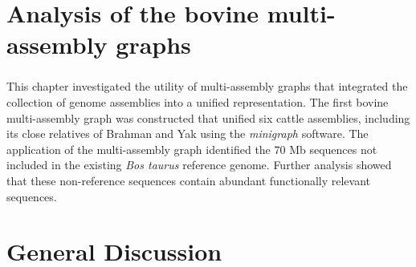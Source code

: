 \documentclass[11 pt, a4paper, notitlepage, twoside]{report}
\begin{document}



\iftwoside
\cleardoublepage
\newpage
\fi

\chapter[Bovine multi-assembly graphs]{\LARGE{Analysis of the bovine multi-assembly graphs}}
\label{chap:multigraph}

\subsection*{}
\normalsize
This chapter investigated the utility of multi-assembly graphs that integrated the collection of genome assemblies into a unified representation. The first bovine multi-assembly graph was constructed that unified six cattle assemblies, including its close relatives of Brahman and Yak using the \emph{minigraph} software. The application of the multi-assembly graph identified the 70 Mb sequences not included in the existing \emph{Bos taurus} reference genome. Further analysis showed that these non-reference sequences contain abundant functionally relevant sequences. \\

\bigskip

\begin{center}\end{center}

\onehalfspacing


\iftwoside
\cleardoublepage
\newpage
\fi


\chapter[General Discussion]{\LARGE{General Discussion}}
\label{chap:discuss}


\end{document}
